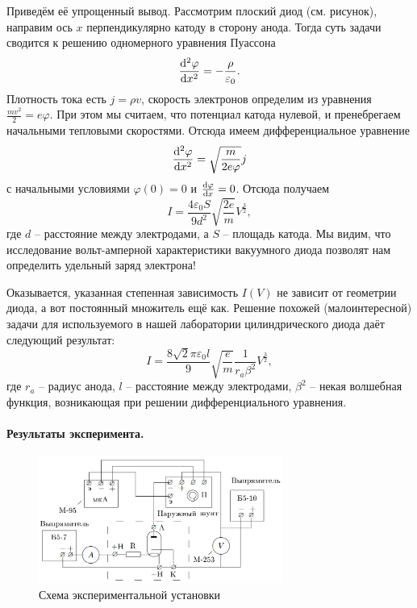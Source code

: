 \documentclass{lab_class}
\begin{document}
Приведём её упрощенный вывод. Рассмотрим плоский диод (см. рисунок), направим ось $x$ перпендикулярно катоду в сторону анода. Тогда суть задачи сводится к решению одномерного уравнения Пуассона
\begin{equation}
	\dv[2]{\varphi}{x} = - \frac{\rho}{\varepsilon_0}.
\end{equation}
Плотность тока есть $j = \rho v$, скорость электронов определим из уравнения $\frac{m v^2}{2} = e \varphi$. При этом мы считаем, что потенциал катода нулевой, и пренебрегаем начальными тепловыми скоростями. Отсюда имеем дифференциальное уравнение
\begin{equation*}
	\dv[2]{\varphi}{x} = \sqrt{\frac{m}{2e\varphi}} j
\end{equation*}
с начальными условиями $\varphi(0) = 0$ и $\dv{\varphi}{x} (0) = 0$. Отсюда получаем
\begin{equation}
	I = \frac{4 \varepsilon_0 S}{9 d^2} \sqrt{\frac{2e}{m}} V^{\frac{3}{2}},
\end{equation}
где $d$ -- расстояние между электродами, а $S$ -- площадь катода. Мы видим, что исследование вольт-амперной характеристики вакуумного диода позволят нам определить удельный заряд электрона!

Оказывается, указанная степенная зависимость $I(V)$ не зависит от геометрии диода, а вот постоянный множитель ещё как. Решение похожей (малоинтересной) задачи для используемого в нашей лаборатории цилиндрического диода даёт следующий результат:
\begin{equation}\label{eq:main_f}
	I = \frac{8\sqrt{2}\pi\varepsilon_0 l}{9} \sqrt{\frac{e}{m}} \frac{1}{r_a \beta^2} V^{\frac{3}{2}},
\end{equation}
где $r_a$ -- радиус анода, $l$ -- расстояние между электродами, $\beta^2$ -- некая волшебная функция, возникающая при решении дифференциального уравнения. 

\paragraph{Результаты эксперимента.}

\begin{figure}
\centering
\includegraphics[width=8cm]{lab_scheme.png}
\caption{Схема экспериментальной установки}
\end{figure}
\end{document}
